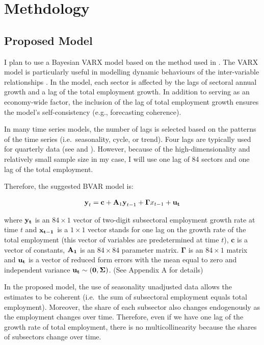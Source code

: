 \documentclass{monashthesis}
\begin{document}
\clearpage

\hypertarget{methdology}{%
\chapter{Methdology}\label{methdology}}

\hypertarget{proposed-model}{%
\section{Proposed Model}\label{proposed-model}}

I plan to use a Bayesian VARX model based on the method used in \textcite{anderson2020}. The VARX model is particularly useful in modelling dynamic behaviours of the inter-variable relationships \autocite{warsono2019}. In the model, each sector is affected by the lags of sectoral annual growth and a lag of the total employment growth. In addition to serving as an economy-wide factor, the inclusion of the lag of total employment growth ensures the model's self-consistency (e.g., forecasting coherence).

In many time series models, the number of lags is selected based on the patterns of the time series (i.e.~seasonality, cycle, or trend). Four lags are typically used for quarterly data (see \textcite{anderson2020} and \textcite{stock2001}). However, because of the high-dimensionality and relatively small sample size in my case, I will use one lag of 84 sectors and one lag of the total employment.

Therefore, the suggested BVAR model is:

\[
\begin{aligned}
\textbf{y}_t=\textbf{c}+\textbf{A}_1 \textbf{y}_{t-1}+\boldsymbol{\Gamma}{x}_{t-1}+\bf{u}_t
\end{aligned}
\]

where \(\bf{y}_t\) is an \(84\times1\) vector of two-digit subsectoral employment growth rate at time \(t\) and \(\bf{x}_{t-1}\) is a \(1\times1\) vector stands for one lag on the growth rate of the total employment (this vector of variables are predetermined at time \(t\)), \(\textbf{c}\) is a vector of constants, \(\bf{A}_{1}\) is an \(84\times84\) parameter matrix. \(\boldsymbol{\Gamma}\) is an \(84\times1\) matrix and \(\bf{u}_t\) is a vector of reduced form errors with the mean equal to zero and independent variance \(\bf{u}_t \sim (0,\boldsymbol{\Sigma})\). (See Appendix A for details)

In the proposed model, the use of seasonality unadjusted data allows the estimates to be coherent (i.e.~the sum of subsectoral employment equals total employment). Moreover, the share of each subsector also changes endogenously as the employment changes over time. Therefore, even if we have one lag of the growth rate of total employment, there is no multicollinearity because the shares of subsectors change over time.
\end{document}
